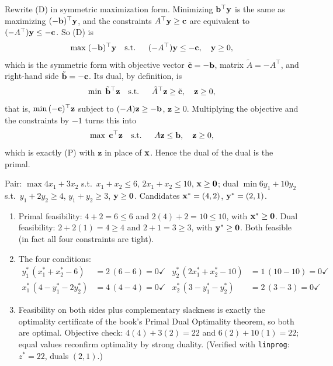Rewrite (D) in symmetric maximization form. Minimizing $\mathbf{b}^\top \mathbf{y}$ is the same as maximizing $(-\mathbf{b})^\top \mathbf{y}$, and the constraints $A^\top \mathbf{y} \geq \mathbf{c}$ are equivalent to $(-A^\top)\mathbf{y} \leq -\mathbf{c}$. So (D) is
\[
\max \; (-\mathbf{b})^\top \mathbf{y} \quad \text{s.t.}\;\; \quad (-A^\top)\mathbf{y} \leq -\mathbf{c}, \quad \mathbf{y} \geq 0,
\]
which is the symmetric form with objective vector $\tilde{\mathbf{c}} = -\mathbf{b}$, matrix $\tilde{A} = -A^\top$, and right-hand side $\tilde{\mathbf{b}} = -\mathbf{c}$. Its dual, by definition, is
\[
\min \; \tilde{\mathbf{b}}^\top \mathbf{z} \quad \text{s.t.}\;\; \quad \tilde{A}^\top \mathbf{z} \geq \tilde{\mathbf{c}}, \quad \mathbf{z} \geq 0,
\]
that is, $\min\, (-\mathbf{c})^\top \mathbf{z}$ subject to $(-A)\mathbf{z} \geq -\mathbf{b}$, $\mathbf{z} \geq 0$. Multiplying the objective and the constraints by $-1$ turns this into
\[
\max \; \mathbf{c}^\top \mathbf{z} \quad \text{s.t.}\;\; \quad A\mathbf{z} \leq \mathbf{b}, \quad \mathbf{z} \geq 0,
\]
which is exactly (P) with $\mathbf{z}$ in place of $\mathbf{x}$. Hence the dual of the dual is the primal.


Pair: $\max 4x_1 + 3x_2$ s.t.\ $x_1 + x_2 \le 6$, $2x_1 + x_2 \le 10$, $\mathbf{x} \ge \mathbf{0}$; dual $\min 6y_1 + 10y_2$ s.t.\ $y_1 + 2y_2 \ge 4$, $y_1 + y_2 \ge 3$, $\mathbf{y} \ge \mathbf{0}$. Candidates $\mathbf{x}^* = (4, 2)$, $\mathbf{y}^* = (2, 1)$.

\begin{enumerate}
\item Primal feasibility: $4 + 2 = 6 \le 6$ and $2(4) + 2 = 10 \le 10$, with $\mathbf{x}^* \ge \mathbf{0}$. Dual feasibility: $2 + 2(1) = 4 \ge 4$ and $2 + 1 = 3 \ge 3$, with $\mathbf{y}^* \ge \mathbf{0}$. Both feasible (in fact all four constraints are tight).
\item The four conditions:
\[
\begin{aligned}
y_1^*\,(x_1^* + x_2^* - 6) &= 2\,(6 - 6) = 0 \checkmark
& y_2^*\,(2x_1^* + x_2^* - 10) &= 1\,(10 - 10) = 0 \checkmark \\
x_1^*\,(4 - y_1^* - 2y_2^*) &= 4\,(4 - 4) = 0 \checkmark
& x_2^*\,(3 - y_1^* - y_2^*) &= 2\,(3 - 3) = 0 \checkmark
\end{aligned}
\]
\item Feasibility on both sides plus complementary slackness is exactly the optimality certificate of the book's Primal Dual Optimality theorem, so both are optimal. Objective check: $4(4) + 3(2) = 22$ and $6(2) + 10(1) = 22$; equal values reconfirm optimality by strong duality. (Verified with \texttt{linprog}: $z^* = 22$, duals $(2,1)$.)
\end{enumerate}

